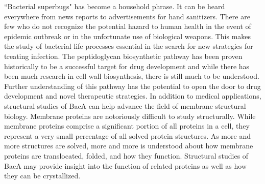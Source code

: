 \documentclass[12pt]{report}
\begin{document}

\indent ``Bacterial superbugs" has become a household phrase. It can be heard everywhere from news reports to advertisements for hand sanitizers. There are few who do not recognize the potential hazard to human health in the event of epidemic outbreak or in the unfortunate use of biological weapons. This makes the study of bacterial life processes essential in the search for new strategies for treating infection. The peptidoglycan biosynthetic pathway has been proven historically to be a successful target for drug development and while there has been much research in cell wall biosynthesis, there is still much to be understood. Further understanding of this pathway has the potential to open the door to drug development and novel therapeutic strategies. In addition to medical applications, structural studies of BacA can help advance the field of membrane structural biology. Membrane proteins are notoriously difficult to study structurally. While membrane proteins comprise a significant portion of all proteins in a cell, they represent a very small percentage of all solved protein structures. As more and more structures are solved, more and more is understood about how membrane proteins are translocated, folded, and how they function. Structural studies of BacA may provide insight into the function of related proteins as well as how they can be crystallized. 

\printbibliography[heading=myheading]
\end{document}
